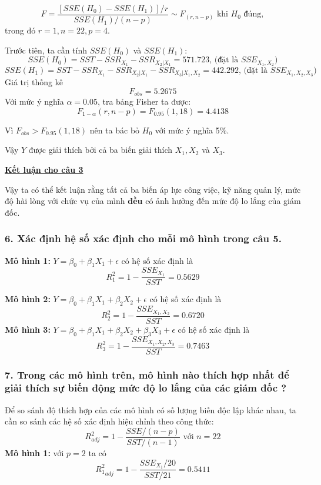 \documentclass[a4paper]{article}
\theoremstyle{nonumberplain}
\begin{document}
$$F = \displaystyle \frac{\left [ SSE (H_0) - SSE(H_1) \right ] / r}{SSE(H_1)/(n-p)}  \sim F_{(r,n-p)} \text{ khi } H_0 \text{ đúng},$$
trong đó $r = 1, n = 22, p = 4$.

Trước tiên, ta cần tính $SSE (H_0)$ và $SSE(H_1)$:
$$SSE(H_0) = SST - SSR_{X_1} - SSR_{X_2|X_1} = 571.723 \text{, (đặt là }  SSE_{X_1,X_2}) $$
$$SSE(H_1) = SST - SSR_{X_1} - SSR_{X_2|X_1} - SSR_{X_3|X_1,X_2} = 442.292 \text{, (đặt là }  SSE_{X_1,X_2,X_3})$$
Giá trị thống kê $$F_{obs} = 5.2675$$
Với mức ý nghĩa $\alpha = 0.05$, tra bảng Fisher ta được:
$$F_{1-\alpha}(r,n-p) = F_{0.95}(1,18) = 4.4138$$

Vì $F_{obs}>F_{0.95}(1,18)$ nên ta bác bỏ $H_0$ với mức ý nghĩa 5\%.

Vậy $Y$ được giải thích bởi cả ba biến giải thích $X_1, X_2$ và $X_3$.

\textbf{\underline{Kết luận cho câu 3}}

Vậy ta có thể kết luận rằng tất cả ba biến áp lực công việc, kỹ năng quản lý, mức độ hài lòng với chức vụ của mình \textbf{đều} có ảnh hưởng đến mức độ lo lắng của giám đốc.

\subsubsection*{6. Xác định hệ số xác định cho mỗi mô hình trong câu 5.}
\textbf{Mô hình 1:} $Y = \beta_0 + \beta_1 X_1 + \epsilon $ có hệ số xác định là
$$R^2_1 = 1 - \displaystyle \frac{SSE_{X_1}}{SST} = 0.5629$$


\textbf{Mô hình 2:} $Y = \beta_0 + \beta_1 X_1 + \beta_2 X_2 + \epsilon $ có hệ số xác định là
$$R^2_2 = 1 - \displaystyle \frac{SSE_{X_1,X_2}}{SST} = 0.6720$$
\textbf{Mô hình 3:} $Y = \beta_0 + \beta_1 X_1 + \beta_2 X_2 + \beta_3 X_3 + \epsilon $ có hệ số xác định là
$$R^2_3 = 1 - \displaystyle \frac{SSE_{X_1,X_2,X_3}}{SST} = 0.7463$$

\subsubsection*{7. Trong các mô hình trên, mô hình nào thích hợp nhất để giải thích sự biến động mức độ lo lắng của các giám đốc ?}
Để so sánh độ thích hợp của các mô hình có số lượng biến độc lập khác nhau, ta cần so sánh các hệ số xác định hiệu chỉnh theo công thức:
$$R^2_{adj} = 1 - \displaystyle \frac{SSE/(n-p)}{SST/(n-1)} \text{ với } n = 22$$
\textbf{Mô hình 1:} với $p=2$ ta có $${R^2_1}_{adj}  = 1 - \displaystyle \frac{SSE_{X_1}/20}{SST/21} = 0.5411$$ 
\end{document}
